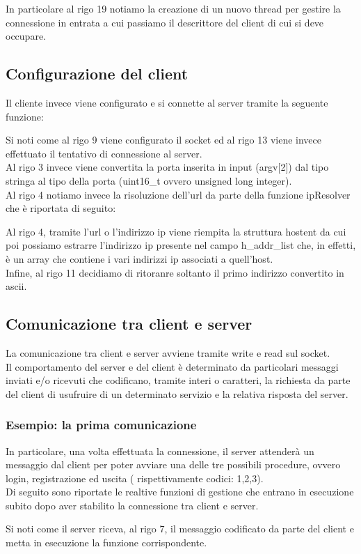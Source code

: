 \documentclass[a4paper]{article}
\begin{document}
In particolare al rigo 19 notiamo la creazione di un nuovo thread per gestire la connessione in entrata a cui passiamo il descrittore del client di cui si deve occupare.
\pagebreak
\subsection{Configurazione del client}
Il cliente invece viene configurato e si connette al server tramite la seguente funzione:


Si noti come al rigo 9 viene configurato il socket ed al rigo 13 viene invece effettuato il tentativo di connessione al server.\\
Al rigo 3 invece viene convertita la porta inserita in input (argv$[$2$]$) dal tipo stringa al tipo della porta (uint16\_t ovvero unsigned long integer).\\
Al rigo 4 notiamo invece la risoluzione dell'url da parte della funzione ipResolver che è riportata di seguito:

Al rigo 4, tramite l'url o l'indirizzo ip viene riempita la struttura hostent da cui poi possiamo estrarre l'indirizzo ip presente nel campo 
h\_addr\_list  che, in effetti, è un array che contiene i vari indirizzi ip associati a quell'host.\\
Infine, al rigo 11 decidiamo di ritoranre soltanto il primo indirizzo convertito in ascii.
\pagebreak
\subsection{Comunicazione tra client e server}
La comunicazione tra client e server avviene tramite write e read sul socket.\\
Il comportamento del server e del client è determinato da particolari messaggi inviati e/o ricevuti che codificano, tramite interi o caratteri, la richiesta da parte del client di usufruire di un determinato servizio e la relativa risposta del server.
 \subsubsection{Esempio: la prima comunicazione}
 In particolare, una volta effettuata la connessione,
il server attenderà un messaggio dal client per poter avviare una delle tre possibili procedure, ovvero login, registrazione ed uscita ( rispettivamente codici: 1,2,3).\\
Di seguito sono riportate le realtive funzioni di gestione che entrano in esecuzione subito dopo aver stabilito la connessione
tra client e server.

Si noti come il server riceva, al rigo 7, il messaggio codificato da parte del client e metta in esecuzione la funzione corrispondente.

\end{document}
